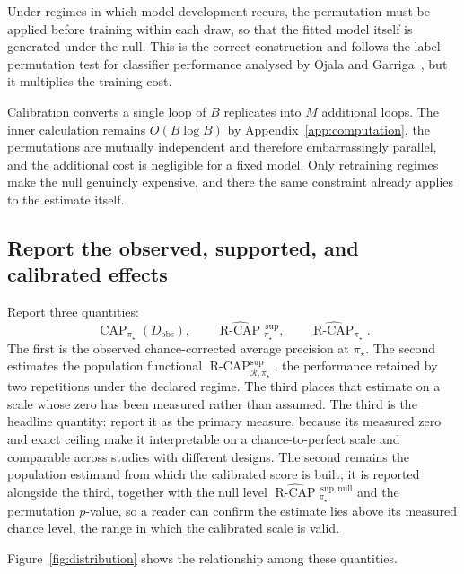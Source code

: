 \documentclass[11pt]{article}
\newcommand{\CAP}{\operatorname{CAP}}
\newcommand{\Regime}{\mathcal{R}}
\newcommand{\Tpi}{\CAP_{\pi_\star}}
\newcommand{\RCAPfull}{\operatorname{R\text{-}CAP}^{\mathrm{sup}}_{\Regime,\pi_\star}}
\newcommand{\RCAPHat}{\widehat{\operatorname{R\text{-}CAP}}{}^{\,\mathrm{sup}}_{\pi_\star}}
\newcommand{\RCAPnullHat}{\widehat{\operatorname{R\text{-}CAP}}{}^{\,\mathrm{sup,null}}_{\pi_\star}}
\newcommand{\RCAPcalHat}{\widehat{\operatorname{R\text{-}CAP}}_{\pi_\star}}
\theoremstyle{remark}
\begin{document}
Under regimes in which model development recurs, the permutation must be applied before training within each draw, so that the fitted model itself is generated under the null. This is the correct construction and follows the label-permutation test for classifier performance analysed by Ojala and Garriga~\cite{ojala2010permutation}, but it multiplies the training cost.

Calibration converts a single loop of $B$ replicates into $M$ additional loops. The inner calculation remains $O(B\log B)$ by Appendix~\ref{app:computation}, the permutations are mutually independent and therefore embarrassingly parallel, and the additional cost is negligible for a fixed model. Only retraining regimes make the null genuinely expensive, and there the same constraint already applies to the estimate itself.

\subsection{Report the observed, supported, and calibrated effects}
\label{sec:reporting}

Report three quantities:
\[
\Tpi(D_{\mathrm{obs}}),
\qquad
\RCAPHat,
\qquad
\RCAPcalHat .
\]
The first is the observed chance-corrected average precision at $\pi_\star$. The second estimates the population functional $\RCAPfull$, the performance retained by two repetitions under the declared regime. The third places that estimate on a scale whose zero has been measured rather than assumed. The third is the headline quantity: report it as the primary measure, because its measured zero and exact ceiling make it interpretable on a chance-to-perfect scale and comparable across studies with different designs. The second remains the population estimand from which the calibrated score is built; it is reported alongside the third, together with the null level $\RCAPnullHat$ and the permutation $p$-value, so a reader can confirm the estimate lies above its measured chance level, the range in which the calibrated scale is valid.

Figure~\ref{fig:distribution} shows the relationship among these quantities.
\end{document}
